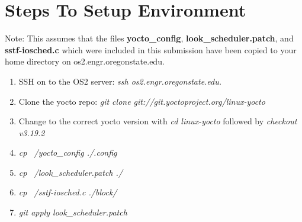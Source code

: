 \documentclass[onecolumn,draftclsnofoot, 10pt, compsoc]{IEEEtran}
\begin{document}
\section{Steps To Setup Environment}
	Note: This assumes that the files \textbf{yocto\_config}, \textbf{look\_scheduler.patch}, and \textbf{sstf-iosched.c} which were included in this submission have been copied to your home directory on os2.engr.oregonstate.edu.
	\begin{enumerate}
		\item
			SSH on to the OS2 server: \textit{ssh os2.engr.oregonstate.edu. }
		\item
			Clone the yocto repo: \textit{git clone git://git.yoctoproject.org/linux-yocto}
		\item 
			Change to the correct yocto version with \textit{cd linux-yocto} followed by \textit{checkout v3.19.2}
		\item 
			\textit{cp ~/yocto\_config ./.config}
		\item 
			\textit{cp ~/look\_scheduler.patch ./}
		\item 
			\textit{cp ~/sstf-iosched.c ./block/}
		\item
			\textit{git apply look\_scheduler.patch}
	\end{enumerate}
\end{document}
